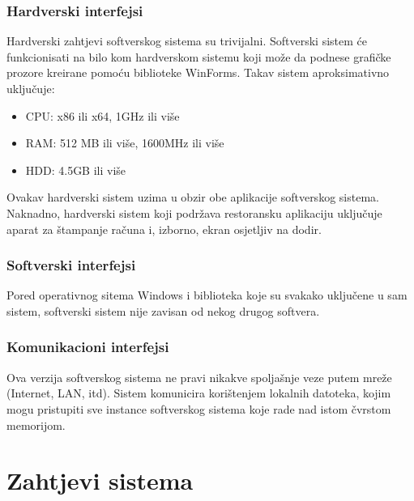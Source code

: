 \documentclass{scrreprt}
\begin{document}
\subsection{Hardverski interfejsi}

Hardverski zahtjevi softverskog sistema su trivijalni.
Softverski sistem će funkcionisati na bilo kom hardverskom sistemu
koji može da podnese grafičke prozore kreirane pomoću biblioteke WinForms.
Takav sistem aproksimativno uključuje:

\begin{itemize}
	\itemsep0em
	\item CPU: x86 ili x64, 1GHz ili više
	\item RAM: 512 MB ili više, 1600MHz ili više
	\item HDD: 4.5GB ili više
\end{itemize}

Ovakav hardverski sistem uzima u obzir obe aplikacije softverskog sistema.
Naknadno, hardverski sistem koji podržava restoransku aplikaciju uključuje
aparat za štampanje računa i, izborno, ekran osjetljiv na dodir.

\subsection{Softverski interfejsi}

Pored operativnog sitema Windows i
biblioteka koje su svakako uključene u sam sistem,
softverski sistem nije zavisan od nekog drugog softvera.

\subsection{Komunikacioni interfejsi}

Ova verzija softverskog sistema
ne pravi nikakve spoljašnje veze putem mreže
(Internet, LAN, itd).
Sistem komunicira korištenjem lokalnih datoteka,
kojim mogu pristupiti sve instance softverskog sistema
koje rade nad istom čvrstom memorijom.



\chapter{Zahtjevi sistema}
\end{document}
